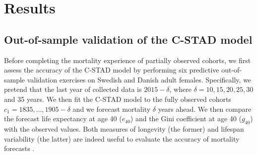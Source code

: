 \documentclass[11pt, a4paper]{article}
\begin{document}

\section{Results}
\label{Sec:Results}

\subsection{Out-of-sample validation of the C-STAD model}
\label{Subsec:Out-of-sample}
Before completing the mortality experience of partially observed cohorts, we first assess the accuracy of the C-STAD model by performing six predictive out-of-sample validation exercises on Swedish and Danish adult females. Specifically, we pretend that the last year of collected data is $2015 - \delta$, where $\delta=10,15,20,25,30$ and 35 years. We then fit the C-STAD model to the fully observed cohorts $c_1=1835,\ldots,1905-\delta$ and we forecast mortality $\delta$ years ahead. We then compare the forecast life expectancy at age 40 ($e_{40}$) and the Gini coefficient at age 40 ($g_{40}$) with the observed values. Both measures of longevity (the former) and lifespan variability (the latter) are indeed useful to evaluate the accuracy of mortality forecasts \citep{bohk2017lifespan}. \par
\end{document}
